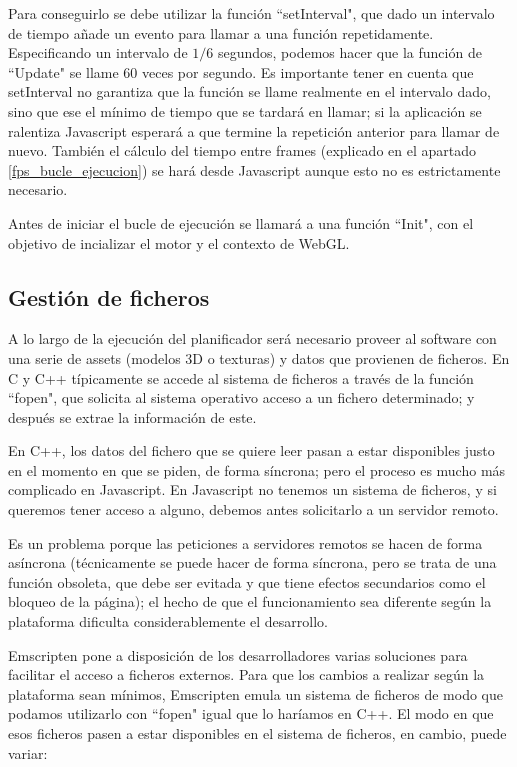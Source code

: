 Para conseguirlo se debe utilizar la función ``setInterval", que dado un intervalo de tiempo añade un evento para llamar a una función repetidamente. Especificando un intervalo de $1/6$ segundos, podemos hacer que la función de ``Update" se llame 60 veces por segundo. Es importante tener en cuenta que setInterval no garantiza que la función se llame realmente en el intervalo dado, sino que ese el mínimo de tiempo que se tardará en llamar; si la aplicación se ralentiza Javascript esperará a que termine la repetición anterior para llamar de nuevo. También el cálculo del tiempo entre frames (explicado en el apartado \ref{fps_bucle_ejecucion}) se hará desde Javascript aunque esto no es estrictamente necesario.

Antes de iniciar el bucle de ejecución se llamará a una función ``Init", con el objetivo de incializar el motor y el contexto de WebGL.

\subsection{Gestión de ficheros}
A lo largo de la ejecución del planificador será necesario proveer al software con una serie de assets (modelos 3D o texturas) y datos que provienen de ficheros. En C y C++ típicamente se accede al sistema de ficheros a través de la función ``fopen", que solicita al sistema operativo acceso a un fichero determinado; y después se extrae la información de este.

En C++, los datos del fichero que se quiere leer pasan a estar disponibles justo en el momento en que se piden, de forma síncrona; pero el proceso es mucho más complicado en Javascript. En Javascript no tenemos un sistema de ficheros, y si queremos tener acceso a alguno, debemos antes solicitarlo a un servidor remoto.

Es un problema porque las peticiones a servidores remotos se hacen de forma asíncrona (técnicamente se puede hacer de forma síncrona, pero se trata de una función obsoleta, que debe ser evitada y que tiene efectos secundarios como el bloqueo de la página); el hecho de que el funcionamiento sea diferente según la plataforma dificulta considerablemente el desarrollo.

Emscripten pone a disposición de los desarrolladores varias soluciones para facilitar el acceso a ficheros externos. Para que los cambios a realizar según la plataforma sean mínimos, Emscripten emula un sistema de ficheros de modo que podamos utilizarlo con ``fopen" igual que lo haríamos en C++. El modo en que esos ficheros pasen a estar disponibles en el sistema de ficheros, en cambio, puede variar:

